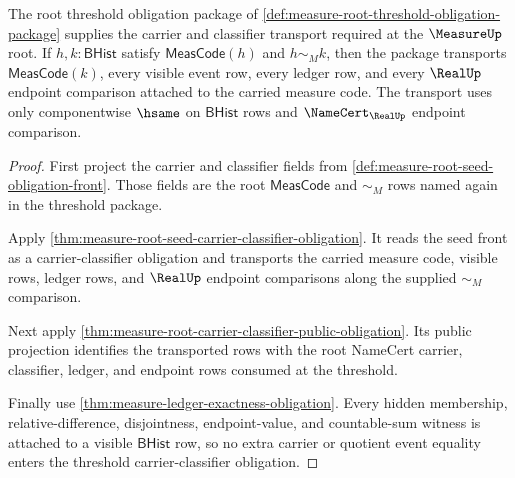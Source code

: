 \begin{theorem}
\label{thm:measure-root-threshold-carrier-classifier-obligation}
The root threshold obligation package of
\autoref{def:measure-root-threshold-obligation-package} supplies the carrier
and classifier transport required at the $\MeasureUp$ root. If
$h,k:\mathsf{BHist}$ satisfy $\mathsf{MeasCode}(h)$ and $h\sim_M k$, then the
package transports $\mathsf{MeasCode}(k)$, every visible event row, every
ledger row, and every $\RealUp$ endpoint comparison attached to the carried
measure code. The transport uses only componentwise $\hsame$ on
$\mathsf{BHist}$ rows and $\NameCert_{\RealUp}$ endpoint comparison.
\end{theorem}
\begin{proof}
First project the carrier and classifier fields from
\autoref{def:measure-root-seed-obligation-front}. Those fields are the
root $\mathsf{MeasCode}$ and $\sim_M$ rows named again in the threshold
package.

Apply \autoref{thm:measure-root-seed-carrier-classifier-obligation}. It reads
the seed front as a carrier-classifier obligation and transports the carried
measure code, visible rows, ledger rows, and $\RealUp$ endpoint comparisons
along the supplied $\sim_M$ comparison.

Next apply \autoref{thm:measure-root-carrier-classifier-public-obligation}.
Its public projection identifies the transported rows with the root
NameCert carrier, classifier, ledger, and endpoint rows consumed at the
threshold.

Finally use \autoref{thm:measure-ledger-exactness-obligation}. Every hidden
membership, relative-difference, disjointness, endpoint-value, and
countable-sum witness is attached to a visible $\mathsf{BHist}$ row, so no
extra carrier or quotient event equality enters the threshold
carrier-classifier obligation.
\end{proof}

